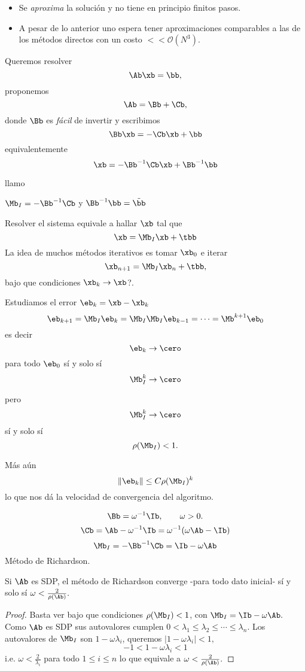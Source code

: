 \begin{center}
 { }
\end{center}

\begin{itemize}
 \item Se \emph{aproxima } la solución y no tiene en principio finitos pasos.
 \item A pesar de lo anterior uno espera tener aproximaciones comparables a las de los métodos directos con un costo  $<<\mathcal{O}(N^3)$.
\end{itemize}


Queremos resolver
$$
\Ab\xb=\bb,
$$
proponemos
$$\Ab=\Bb+\Cb,$$
donde $\Bb$ es \emph{fácil} de invertir y escribimos
$$
\Bb\xb=-\Cb\xb+\bb
$$
equivalentemente
$$
\xb=-\Bb^{-1}\Cb\xb+\Bb^{-1}\bb
$$


llamo

$\Mb_I=-\Bb^{-1}\Cb$ y $\Bb^{-1}\bb=\tilde{\bb}$

Resolver el sistema equivale a hallar $\xb$ tal que
$$
\xb=\Mb_I\xb+\tbb
$$
La idea de muchos métodos iterativos es tomar $\xb_0$ e iterar
$$
\xb_{n+1}=\Mb_I\xb_n+\tbb,
$$
bajo que condiciones $\xb_k\to \xb$?.

Estudiamos el error $\eb_k=\xb-\xb_k$
$$
\eb_{k+1}=\Mb_I\eb_k=\Mb_I\Mb_I\eb_{k-1}=\cdots = \Mb^{k+1}\eb_0
$$
es decir
$$\eb_k\to \cero$$
para todo $\eb_0$ sí y solo sí
$$\Mb_I^{k}\to \cero $$

pero
$$\Mb_I^{k}\to \cero $$
sí y solo sí
$$
\rho(\Mb_I)<1.
$$

Más aún
$$
\|\eb_k\|\le C\rho(\Mb_I)^k
$$
lo que nos dá la velocidad de convergencia del algoritmo.

$$\Bb=\omega^{-1}\Ib, \qquad \omega>0.$$
$$\Cb=\Ab-\omega^{-1}\Ib=\omega^{-1}(\omega\Ab-\Ib)$$
$$
\Mb_I=-\Bb^{-1}\Cb=
\Ib-\omega\Ab
$$
Método de Richardson.

\tcc
\begin{prop}
Si $\Ab$ es SDP, el método de Richardson converge -para todo dato inicial- sí y solo sí $\omega<\frac{2}{\rho(\Ab)}.$
\end{prop}
\etcc

\begin{proof}
 Basta ver bajo que condiciones $\rho(\Mb_I)<1$, con $
\Mb_I=
\Ib-\omega\Ab.
$ Como $\Ab$ es SDP sus autovalores cumplen $0<\lambda_1\le \lambda_2\le \cdots \le \lambda_n$. Los autovalores de $
\Mb_I$ son $1-\omega\lambda_i$, queremos
$
|1-\omega\lambda_i|<1,
$
$$
-1< 1-\omega\lambda_i< 1
$$
i.e. $\omega<\frac{2}{\lambda_i}$ para todo $1\le i\le n$ lo que equivale a
$\omega<\frac{2}{\rho(\Ab)}.$
\end{proof}

